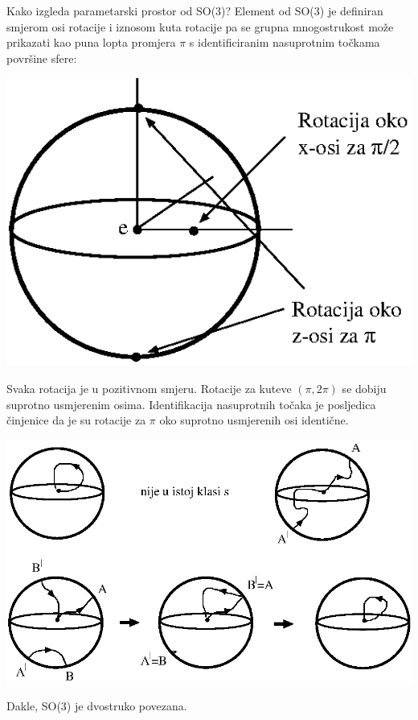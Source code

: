 \begin{primjer}[SO(3)]
Kako izgleda parametarski prostor od SO(3)? Element od SO(3) je definiran
smjerom osi rotacije i iznosom kuta rotacije pa se grupna mnogostrukost
može prikazati kao puna lopta promjera $\pi$ s identificiranim nasuprotnim
točkama površine sfere:

\centerline{\includegraphics[scale=0.8]{pics/so3mnogostrukost.eps}}

Svaka rotacija je u pozitivnom smjeru. Rotacije za kuteve $(\pi, 2\pi)$ se dobiju
suprotno usmjerenim osima. Identifikacija nasuprotnih točaka je posljedica
činjenice da je su rotacije za $\pi$ oko suprotno usmjerenih osi
identične.

\centerline{\includegraphics[scale=0.8]{pics/dvostruka_povezanost_so3.eps}}

Dakle, SO(3) je dvostruko povezana.
\end{primjer}

